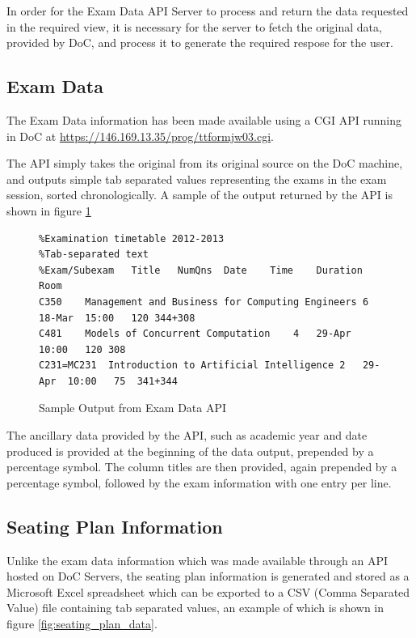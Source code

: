 In order for the Exam Data API Server to process and return the data requested in the required view, it is necessary for the server to fetch the original data, provided by DoC, and process it to generate the required respose for the user.

\subsection{Exam Data}
\label{subsec:examData}

\FloatBarrier

The Exam Data information has been made available using a CGI API running in DoC at \url{https://146.169.13.35/prog/ttformjw03.cgi}.

The API simply takes the original from its original source on the DoC machine, and outputs simple tab separated values representing the exams in the exam session, sorted chronologically.  A sample of the output returned by the API is shown in figure \ref{fig:exam_data_api}

\begin{figure}[!htbp]
\centering
\begin{lstlisting}[tabsize=2,breaklines=true]
%Printed at Sat Jun 14 11:57:47 BST 2014
%Examination timetable 2012-2013
%Tab-separated text
%Exam/Subexam	Title	NumQns	Date	Time	Duration	Room
C350	Management and Business for Computing Engineers	6	18-Mar	15:00	120	344+308
C481	Models of Concurrent Computation	4	29-Apr	10:00	120	308
C231=MC231	Introduction to Artificial Intelligence	2	29-Apr	10:00	75	341+344
\end{lstlisting}
\caption{Sample Output from Exam Data API}
\label{fig:exam_data_api}
\end{figure}

The ancillary data provided by the API, such as academic year and date produced is provided at the beginning of the data output, prepended by a percentage symbol.  The column titles are then provided, again prepended by a percentage symbol, followed by the exam information with one entry per line.

\FloatBarrier

\subsection{Seating Plan Information}
\label{subs:seating_plan_info}

\FloatBarrier

Unlike the exam data information which was made available through an API hosted on DoC Servers, the seating plan information is generated and stored as a Microsoft Excel spreadsheet which can be exported to a CSV (Comma Separated Value) file containing tab separated values, an example of which is shown in figure \ref{fig:seating_plan_data}.

